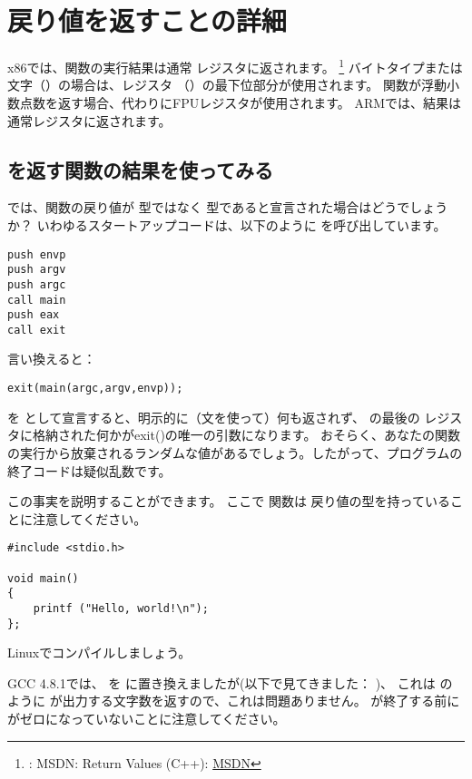 \section{戻り値を返すことの詳細}


x86では、関数の実行結果は通常 \EAX レジスタに返されます。
\footnote{\Seealso: MSDN: Return Values (C++): \href{http://go.yurichev.com/17258}{MSDN}}
バイトタイプまたは文字（\Tchar）の場合は、レジスタ \EAX （\AL）の最下位部分が使用されます。
関数が浮動小数点数を返す場合、代わりにFPUレジスタが使用されます。 
ARMでは、結果は通常レジスタに返されます。

\subsection{\Tvoid を返す関数の結果を使ってみる}

では、\main 関数の戻り値が \Tint 型ではなく \Tvoid 型であると宣言された場合はどうでしょうか？
いわゆるスタートアップコードは、以下のように \main を呼び出しています。

\begin{lstlisting}[style=customasmx86]
push envp
push argv
push argc
call main
push eax
call exit
\end{lstlisting}

言い換えると：

\begin{lstlisting}[style=customc]
exit(main(argc,argv,envp));
\end{lstlisting}

\main を \Tvoid として宣言すると、明示的に（文を使って）何も返されず、
\main の最後の \EAX レジスタに格納された何かがexit()の唯一の引数になります。
おそらく、あなたの関数の実行から放棄されるランダムな値があるでしょう。したがって、プログラムの終了コードは疑似乱数です。
\par
この事実を説明することができます。
ここで \main 関数は \Tvoid 戻り値の型を持っていることに注意してください。

\begin{lstlisting}[style=customc]
#include <stdio.h>

void main()
{
	printf ("Hello, world!\n");
};
\end{lstlisting}

Linuxでコンパイルしましょう。

GCC 4.8.1では、 \printf を \puts に置き換えましたが(以下で見てきました： )、
これは \printf のように \puts が出力する文字数を返すので、これは問題ありません。 
\main が終了する前に \EAX がゼロになっていないことに注意してください。

